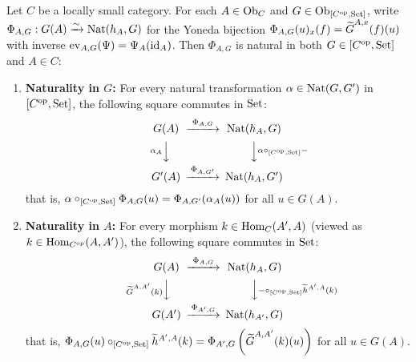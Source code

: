 \documentclass[10pt,a4paper]{article}
\begin{document}
\begin{theorem}
Let $C$ be a locally small category. For each $A \in {\textrm{Ob}}_C$ and $G \in {\textrm{Ob}}_{[C^{\textrm{op}}, {\textrm{Set}}]}$, write $\Phi_{A,G} : G(A) \xrightarrow{\sim} {\textrm{Nat}}(h_A, G)$ for the Yoneda bijection $\Phi_{A,G}(u)_x(f) = {\widetilde{G}\textrm{}}^{A,x}(f)(u)$ with inverse $\mathrm{ev}_{A,G}(\Psi) = \Psi_A({\textrm{id}}_A)$. Then $\Phi_{A,G}$ is natural in both $G \in [C^{\textrm{op}}, {\textrm{Set}}]$ and $A \in C$:
\begin{enumerate}
\item \textbf{Naturality in $G$:} For every natural transformation $\alpha \in {\textrm{Nat}}(G, G')$ in $[C^{\textrm{op}}, {\textrm{Set}}]$, the following square commutes in ${\textrm{Set}}$:
$$\begin{CD}
G(A) @>{\Phi_{A,G}}>> \Nat(h_A, G) \\
@V{\alpha_A}VV @VV{\alpha \circ_{[C^\op,\Set]} -}V \\
G'(A) @>{\Phi_{A,G'}}>> \Nat(h_A, G')
\end{CD}$$
that is, $\alpha \circ_{[C^{\textrm{op}},{\textrm{Set}}]} \Phi_{A,G}(u) = \Phi_{A,G'}(\alpha_A(u))$ for all $u \in G(A)$.
\item \textbf{Naturality in $A$:} For every morphism $k \in {\textrm{Hom}}_C(A', A)$ (viewed as $k \in {\textrm{Hom}}_{C^{\textrm{op}}}(A, A')$), the following square commutes in ${\textrm{Set}}$:
$$\begin{CD}
G(A) @>{\Phi_{A,G}}>> \Nat(h_A, G) \\
@V{\GMor^{A,A'}(k)}VV @VV{- \circ_{[C^\op,\Set]} \widetilde{h}^{A',A}(k)}V \\
G(A') @>{\Phi_{A',G}}>> \Nat(h_{A'}, G)
\end{CD}$$
that is, $\Phi_{A,G}(u) \circ_{[C^{\textrm{op}},{\textrm{Set}}]} \widetilde{h}^{A',A}(k) = \Phi_{A',G}\left({\widetilde{G}\textrm{}}^{A,A'}(k)(u)\right)$ for all $u \in G(A)$.
\end{enumerate}
\end{theorem}
\myprf
\end{document}
